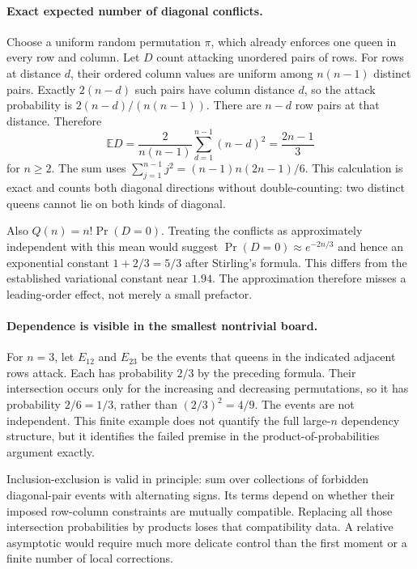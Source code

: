 \documentclass[11pt,a4paper]{article}
\newcommand{\E}{\mathbb{E}}
\begin{document}
\paragraph{Exact expected number of diagonal conflicts.}
Choose a uniform random permutation $\pi$, which already enforces one queen in every row and column. Let $D$ count attacking unordered pairs of rows. For rows at distance $d$, their ordered column values are uniform among $n(n-1)$ distinct pairs. Exactly $2(n-d)$ such pairs have column distance $d$, so the attack probability is $2(n-d)/(n(n-1))$. There are $n-d$ row pairs at that distance. Therefore
\[
 \E D=\frac{2}{n(n-1)}\sum_{d=1}^{n-1}(n-d)^2
 =\frac{2n-1}{3}
\]
for $n\geq2$. The sum uses $\sum_{j=1}^{n-1}j^2=(n-1)n(2n-1)/6$. This calculation is exact and counts both diagonal directions without double-counting: two distinct queens cannot lie on both kinds of diagonal.

Also $Q(n)=n!\Pr(D=0)$. Treating the conflicts as approximately independent with this mean would suggest $\Pr(D=0)\approx e^{-2n/3}$ and hence an exponential constant $1+2/3=5/3$ after Stirling's formula. This differs from the established variational constant near $1.94$. The approximation therefore misses a leading-order effect, not merely a small prefactor.

\paragraph{Dependence is visible in the smallest nontrivial board.}
For $n=3$, let $E_{12}$ and $E_{23}$ be the events that queens in the indicated adjacent rows attack. Each has probability $2/3$ by the preceding formula. Their intersection occurs only for the increasing and decreasing permutations, so it has probability $2/6=1/3$, rather than $(2/3)^2=4/9$. The events are not independent. This finite example does not quantify the full large-$n$ dependency structure, but it identifies the failed premise in the product-of-probabilities argument exactly.

Inclusion-exclusion is valid in principle: sum over collections of forbidden diagonal-pair events with alternating signs. Its terms depend on whether their imposed row-column constraints are mutually compatible. Replacing all those intersection probabilities by products loses that compatibility data. A relative asymptotic would require much more delicate control than the first moment or a finite number of local corrections.
\end{document}
